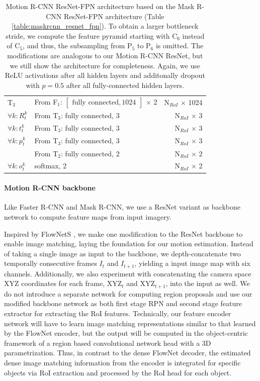 {\begin{table}[h]
\begin{tabular}{llr}
T$_3$ & From F$_1$: $\begin{bmatrix}\textrm{fully connected}, 1024\end{bmatrix}$ $\times$ 2 & N$_{RoI}$ $\times$ 1024 \\
$\forall k: R_t^k$ & From T$_3$: fully connected, 3 & N$_{RoI}$ $\times$ 3 \\
$\forall k: t_t^k$ & From T$_3$: fully connected, 3 & N$_{RoI}$ $\times$ 3 \\
$\forall k: p_t^k$ & From T$_3$: fully connected, 3 & N$_{RoI}$ $\times$ 3 \\
& From T$_2$: fully connected, 2 & N$_{RoI}$ $\times$ 2 \\
$\forall k: o_t^k$ & softmax, 2 & N$_{RoI}$ $\times$ 2 \\

\bottomrule
\end{tabular}

\caption {
Motion R-CNN ResNet-FPN architecture based on the Mask R-CNN
ResNet-FPN architecture (Table \ref{table:maskrcnn_resnet_fpn}).
To obtain a larger bottleneck stride, we compute the feature pyramid starting
with C$_6$ instead of C$_5$, and thus, the subsampling from P$_5$ to P$_6$ is omitted.
The modifications are analogous to our Motion R-CNN ResNet,
but we still show the architecture for completeness.
Again, we use ReLU activations after all hidden layers and
additonally dropout with $p = 0.5$ after all fully-connected hidden layers.
}
\label{table:motionrcnn_resnet_fpn}
\end{table}
}

\paragraph{Motion R-CNN backbone}
Like Faster R-CNN and Mask R-CNN, we use a ResNet \cite{ResNet} variant as backbone network to compute feature maps from input imagery.

Inspired by FlowNetS \cite{FlowNet}, we make one modification to the ResNet backbone to enable image matching,
laying the foundation for our motion estimation. Instead of taking a single image as input to the backbone,
we depth-concatenate two temporally consecutive frames $I_t$ and $I_{t+1}$, yielding a input image map with six channels.
Additionally, we also experiment with concatenating the camera space XYZ coordinates for each frame,
XYZ$_t$ and XYZ$_{t+1}$, into the input as well.
We do not introduce a separate network for computing region proposals and use our modified backbone network
as both first stage RPN and second stage feature extractor for extracting the RoI features.
Technically, our feature encoder network will have to learn image matching representations similar to
that learned by the FlowNet encoder, but the output will be computed in the
object-centric framework of a region based convolutional network head with a 3D parametrization.
Thus, in contrast to the dense FlowNet decoder, the estimated dense image matching information
from the encoder is integrated for specific objects via RoI extraction and
processed by the RoI head for each object.

